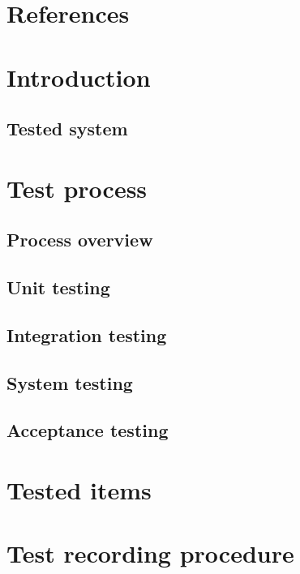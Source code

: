 \documentclass[12pt,titlepage,bibliography=totoc]{article}
\begin{document}


\maketitle
\newpage
\tableofcontents
\thispagestyle{empty}
\setcounter{page}{0}
\newpage

\section{References}
\label{sec:references}

\section{Introduction}
\label{sec:introduction}
\subsection{Tested system}

\section{Test process}
\label{sec:test-process}
\subsection{Process overview}
\subsection{Unit testing}
\subsection{Integration testing}
\subsection{System testing}
\subsection{Acceptance testing}

\section{Tested items}
\label{sec:tested-items}

\section{Test recording procedure}
\label{test-recording-procedure}
\end{document}
